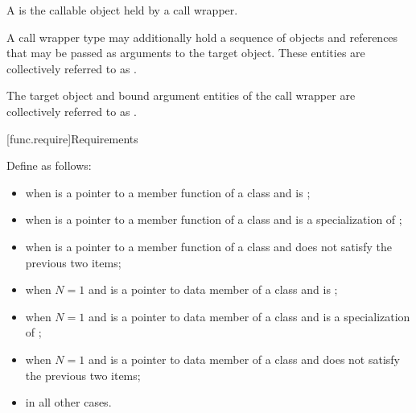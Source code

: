 \pnum
A  is the callable object held by a call wrapper.

\pnum
A call wrapper type may additionally hold
a sequence of objects and references
that may be passed as arguments to the target object.
These entities are collectively referred to
as .

\pnum
The target object and bound argument entities of the call wrapper are
collectively referred to as .

[func.require]{Requirements}

\pnum
{}%
%
Define  as follows:
\begin{itemize}
\item {} when  is a pointer to a
member function of a class 
and
 is ;

\item {} when  is a pointer to a
member function of a class 
and  is a specialization of ;

\item {} when  is a pointer to a
member function of a class 
and  does not satisfy the previous two items;

\item {} when $N = 1$ and  is a pointer to
data member of a class 
and
 is ;

\item {} when $N = 1$ and  is a pointer to
data member of a class 
and  is a specialization of ;

\item {} when $N = 1$ and  is a pointer to
data member of a class 
and  does not satisfy the previous two items;

\item {} in all other cases.
\end{itemize}

